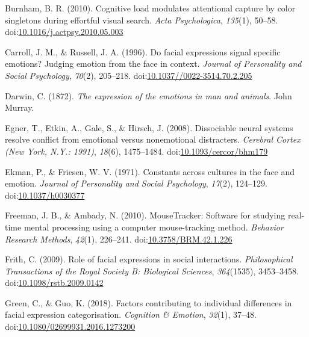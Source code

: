 \documentclass[man]{apa6}
\begin{document}
\leavevmode\hypertarget{ref-burnham_cognitive_2010}{}%
Burnham, B. R. (2010). Cognitive load modulates attentional capture by color singletons during effortful visual search. \emph{Acta Psychologica}, \emph{135}(1), 50--58. doi:\href{https://doi.org/10.1016/j.actpsy.2010.05.003}{10.1016/j.actpsy.2010.05.003}

\leavevmode\hypertarget{ref-carroll_facial_1996}{}%
Carroll, J. M., \& Russell, J. A. (1996). Do facial expressions signal specific emotions? Judging emotion from the face in context. \emph{Journal of Personality and Social Psychology}, \emph{70}(2), 205--218. doi:\href{https://doi.org/10.1037//0022-3514.70.2.205}{10.1037//0022-3514.70.2.205}

\leavevmode\hypertarget{ref-darwin_expression_1872}{}%
Darwin, C. (1872). \emph{The expression of the emotions in man and animals}. John Murray.

\leavevmode\hypertarget{ref-egner_dissociable_2008}{}%
Egner, T., Etkin, A., Gale, S., \& Hirsch, J. (2008). Dissociable neural systems resolve conflict from emotional versus nonemotional distracters. \emph{Cerebral Cortex (New York, N.Y.: 1991)}, \emph{18}(6), 1475--1484. doi:\href{https://doi.org/10.1093/cercor/bhm179}{10.1093/cercor/bhm179}

\leavevmode\hypertarget{ref-ekman_constants_1971}{}%
Ekman, P., \& Friesen, W. V. (1971). Constants across cultures in the face and emotion. \emph{Journal of Personality and Social Psychology}, \emph{17}(2), 124--129. doi:\href{https://doi.org/10.1037/h0030377}{10.1037/h0030377}

\leavevmode\hypertarget{ref-freeman_mousetracker:_2010}{}%
Freeman, J. B., \& Ambady, N. (2010). MouseTracker: Software for studying real-time mental processing using a computer mouse-tracking method. \emph{Behavior Research Methods}, \emph{42}(1), 226--241. doi:\href{https://doi.org/10.3758/BRM.42.1.226}{10.3758/BRM.42.1.226}

\leavevmode\hypertarget{ref-frith_role_2009}{}%
Frith, C. (2009). Role of facial expressions in social interactions. \emph{Philosophical Transactions of the Royal Society B: Biological Sciences}, \emph{364}(1535), 3453--3458. doi:\href{https://doi.org/10.1098/rstb.2009.0142}{10.1098/rstb.2009.0142}

\leavevmode\hypertarget{ref-green_factors_2018}{}%
Green, C., \& Guo, K. (2018). Factors contributing to individual differences in facial expression categorisation. \emph{Cognition \& Emotion}, \emph{32}(1), 37--48. doi:\href{https://doi.org/10.1080/02699931.2016.1273200}{10.1080/02699931.2016.1273200}
\end{document}
